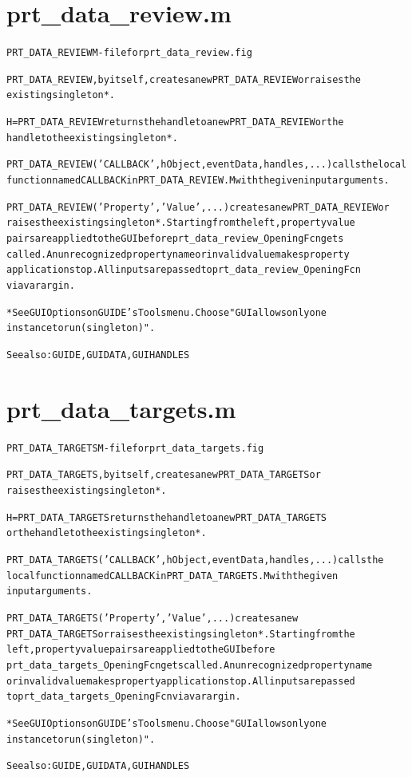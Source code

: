 \section{prt\_data\_review.m}
\begin{alltt}

 PRT\_DATA\_REVIEW M-file for prt\_data\_review.fig
 
 PRT\_DATA\_REVIEW, by itself, creates a new PRT\_DATA\_REVIEW or raises the 
 existing singleton*.
 
 H = PRT\_DATA\_REVIEW returns the handle to a new PRT\_DATA\_REVIEW or the 
 handle to the existing singleton*.
 
 PRT\_DATA\_REVIEW('CALLBACK',hObject,eventData,handles,...) calls the local
 function named CALLBACK in PRT\_DATA\_REVIEW.M with the given input arguments.
 
 PRT\_DATA\_REVIEW('Property','Value',...) creates a new PRT\_DATA\_REVIEW or 
 raises the existing singleton*.  Starting from the left, property value 
 pairs are applied to the GUI before prt\_data\_review\_OpeningFcn gets 
 called.  An unrecognized property name or invalid value makes property 
 application stop.  All inputs are passed to prt\_data\_review\_OpeningFcn 
 via varargin.
 
 *See GUI Options on GUIDE's Tools menu.  Choose "GUI allows only one
  instance to run (singleton)".
 
 See also: GUIDE, GUIDATA, GUIHANDLES
\end{alltt}


\section{prt\_data\_targets.m}
\begin{alltt}

 PRT\_DATA\_TARGETS M-file for prt\_data\_targets.fig
 
 PRT\_DATA\_TARGETS, by itself, creates a new PRT\_DATA\_TARGETS or 
 raises the existing singleton*.
 
 H = PRT\_DATA\_TARGETS returns the handle to a new PRT\_DATA\_TARGETS 
 or the handle to the existing singleton*.
 
 PRT\_DATA\_TARGETS('CALLBACK',hObject,eventData,handles,...) calls the 
 local function named CALLBACK in PRT\_DATA\_TARGETS.M with the given 
 input arguments.
 
 PRT\_DATA\_TARGETS('Property','Value',...) creates a new 
 PRT\_DATA\_TARGETS or raises the existing singleton*.  Starting from the
 left, property value pairs are applied to the GUI before 
 prt\_data\_targets\_OpeningFcn gets called.  An unrecognized property name
 or invalid value makes property application stop.  All inputs are passed 
 to prt\_data\_targets\_OpeningFcn via varargin.
 
 *See GUI Options on GUIDE's Tools menu.  Choose "GUI allows only one
  instance to run (singleton)".
 
 See also: GUIDE, GUIDATA, GUIHANDLES
\end{alltt}


